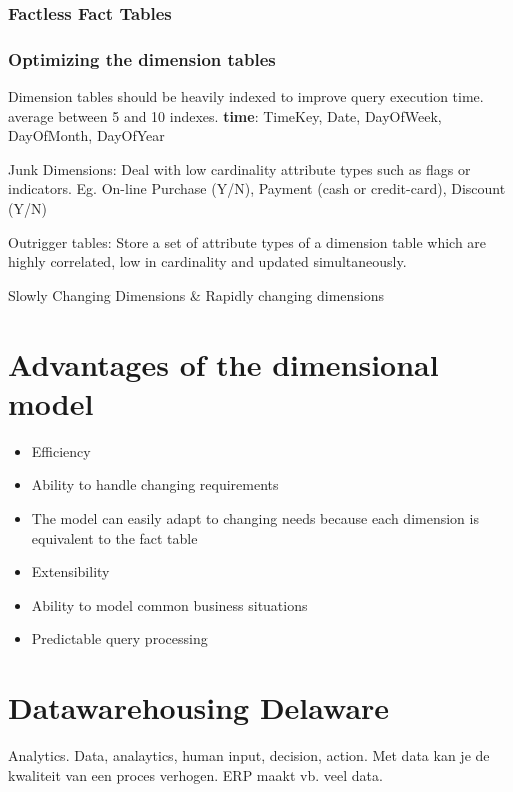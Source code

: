 \documentclass{report}
\begin{document}
    \subsubsection{Factless Fact Tables}
    \subsubsection{Optimizing the dimension tables}
    Dimension tables should be heavily indexed to improve query execution time. average between 5 and 10 indexes. \textbf{time}: TimeKey, Date, DayOfWeek, DayOfMonth, DayOfYear
    
    Junk Dimensions: Deal with low cardinality attribute types such as flags or indicators. Eg. On-line Purchase (Y/N), Payment (cash or credit-card), Discount (Y/N)
    
    Outrigger tables: Store a set of attribute types of a dimension table which are highly correlated, low in cardinality and updated simultaneously.
    
    Slowly Changing Dimensions \& Rapidly changing dimensions
    
    \section{Advantages of the dimensional model}
    \begin{itemize}
        \item Efficiency
        \item Ability to handle changing requirements
        \item The model can easily adapt to changing needs because each dimension is equivalent to the fact table
        \item Extensibility
        \item Ability to model common business situations
        \item Predictable query processing
    \end{itemize}
    
    \section{Datawarehousing Delaware}
    Analytics. Data, analaytics, human input, decision, action.
    Met data kan je de kwaliteit van een proces verhogen. ERP maakt vb. veel data.
    
\end{document}
